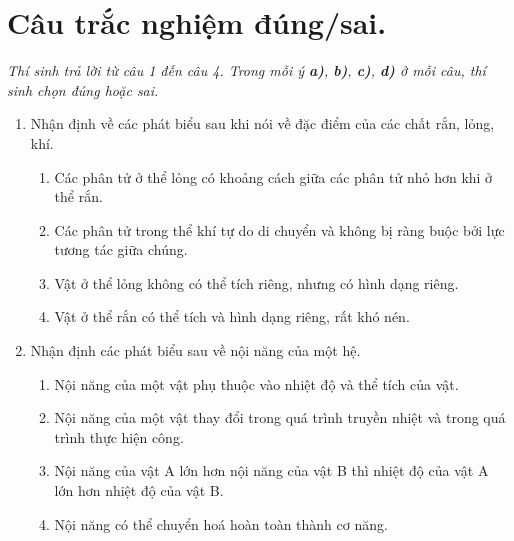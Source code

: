\section{Câu trắc nghiệm đúng/sai.} 
\textit{Thí sinh trả lời từ câu 1 đến câu 4. Trong mỗi ý \textbf{a)}, \textbf{b)}, \textbf{c)}, \textbf{d)} ở mỗi câu, thí sinh chọn đúng hoặc sai.}
\begin{enumerate}[label=\bfseries Câu \arabic*:, leftmargin=1.7cm]

	\item Nhận định về các phát biểu sau khi nói về đặc điểm của các chất rắn, lỏng, khí.
	\begin{enumerate}[label=\alph*)]
		\item Các phân tử ở thể lỏng có khoảng cách giữa các phân tử nhỏ hơn khi ở thể rắn.
		\item Các phân tử trong thể khí tự do di chuyển và không bị ràng buộc bởi lực tương tác giữa chúng.
		\item Vật ở thể lỏng không có thể tích riêng, nhưng có hình dạng riêng.
		\item Vật ở thể rắn có thể tích và hình dạng riêng, rất khó nén.
	\end{enumerate}

\item Nhận định các phát biểu sau về nội năng của một hệ.
\begin{enumerate}[label=\alph*)]
	\item Nội năng của một vật phụ thuộc vào nhiệt độ và thể tích của vật.
	\item Nội năng của một vật thay đổi trong quá trình truyền nhiệt và trong quá trình thực hiện công.
	\item Nội năng của vật A lớn hơn nội năng của vật B thì nhiệt độ của vật A lớn hơn nhiệt độ của vật B.
	\item Nội năng có thể chuyển hoá hoàn toàn thành cơ năng.
\end{enumerate}



\end{enumerate}
